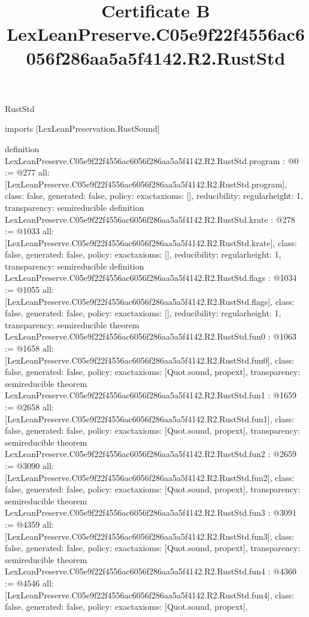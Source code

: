 \begin{lexlean}{RustStd}
\title{Certificate B LexLeanPreserve.C05e9f22f4556ac6056f286aa5a5f4142.R2.RustStd}
\begin{coremodule}
imports [LexLeanPreservation.RustSound]

definition LexLeanPreserve.C05e9f22f4556ac6056f286aa5a5f4142.R2.RustStd.program : @0 := @277 {
  all: [LexLeanPreserve.C05e9f22f4556ac6056f286aa5a5f4142.R2.RustStd.program],
  class: false,
  generated: false,
  policy: exact{axioms: []},
  reducibility: regular{height: 1},
  transparency: semireducible
}
definition LexLeanPreserve.C05e9f22f4556ac6056f286aa5a5f4142.R2.RustStd.krate : @278 := @1033 {
  all: [LexLeanPreserve.C05e9f22f4556ac6056f286aa5a5f4142.R2.RustStd.krate],
  class: false,
  generated: false,
  policy: exact{axioms: []},
  reducibility: regular{height: 1},
  transparency: semireducible
}
definition LexLeanPreserve.C05e9f22f4556ac6056f286aa5a5f4142.R2.RustStd.flags : @1034 := @1055 {
  all: [LexLeanPreserve.C05e9f22f4556ac6056f286aa5a5f4142.R2.RustStd.flags],
  class: false,
  generated: false,
  policy: exact{axioms: []},
  reducibility: regular{height: 1},
  transparency: semireducible
}
theorem LexLeanPreserve.C05e9f22f4556ac6056f286aa5a5f4142.R2.RustStd.fun0 : @1063 := @1658 {
  all: [LexLeanPreserve.C05e9f22f4556ac6056f286aa5a5f4142.R2.RustStd.fun0],
  class: false,
  generated: false,
  policy: exact{axioms: [Quot.sound, propext]},
  transparency: semireducible
}
theorem LexLeanPreserve.C05e9f22f4556ac6056f286aa5a5f4142.R2.RustStd.fun1 : @1659 := @2658 {
  all: [LexLeanPreserve.C05e9f22f4556ac6056f286aa5a5f4142.R2.RustStd.fun1],
  class: false,
  generated: false,
  policy: exact{axioms: [Quot.sound, propext]},
  transparency: semireducible
}
theorem LexLeanPreserve.C05e9f22f4556ac6056f286aa5a5f4142.R2.RustStd.fun2 : @2659 := @3090 {
  all: [LexLeanPreserve.C05e9f22f4556ac6056f286aa5a5f4142.R2.RustStd.fun2],
  class: false,
  generated: false,
  policy: exact{axioms: [Quot.sound, propext]},
  transparency: semireducible
}
theorem LexLeanPreserve.C05e9f22f4556ac6056f286aa5a5f4142.R2.RustStd.fun3 : @3091 := @4359 {
  all: [LexLeanPreserve.C05e9f22f4556ac6056f286aa5a5f4142.R2.RustStd.fun3],
  class: false,
  generated: false,
  policy: exact{axioms: [Quot.sound, propext]},
  transparency: semireducible
}
theorem LexLeanPreserve.C05e9f22f4556ac6056f286aa5a5f4142.R2.RustStd.fun4 : @4360 := @4546 {
  all: [LexLeanPreserve.C05e9f22f4556ac6056f286aa5a5f4142.R2.RustStd.fun4],
  class: false,
  generated: false,
  policy: exact{axioms: [Quot.sound, propext]},
}
\end{coremodule}
\end{lexlean}
